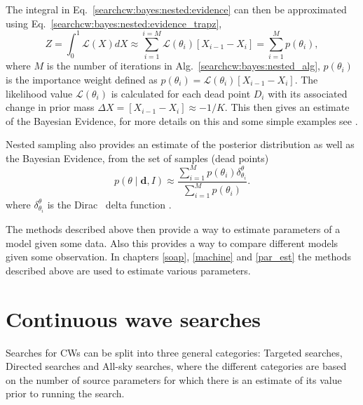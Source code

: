 The integral in Eq.~\ref{searchcw:bayes:nested:evidence} can then be approximated using Eq.~\ref{searchcw:bayes:nested:evidence_trapz},
\begin{equation}
\label{searchcw:bayes:nested:approx_evidence}
	Z = \int_0^1 \mathcal{L}(X) dX \approx \sum_{i=1}^{i=M}  \mathcal{L}(\theta_i)  \left[ X_{i-1} - X_{i} \right] = \sum_{i=1}^{M} p(\theta_i),
\end{equation}
where $M$ is the number of iterations in Alg.~\ref{searchcw:bayes:nested_alg}, $p(\theta_i)$ is the importance weight defined as $p(\theta_i) =  \mathcal{L}(\theta_i) \left[ X_{i-1} - X_{i} \right]$. The likelihood value $\mathcal{L}(\theta_i)$ is calculated for each dead point $D_i$ with its associated change in prior mass $\Delta X = \left[ X_{i-1} - X_{i} \right] \approx -1/K$. 
This then gives an estimate of the Bayesian Evidence, for more details on this and some simple examples see \citep{skilling2006NestedSampling,speagle2019DynestyDynamic,feroz2019ImportanceNested}.

Nested sampling also provides an estimate of the posterior distribution as well as the Bayesian Evidence, from the set of samples (dead points) 
\begin{equation}
	p(\theta \mid \bm{d}, I) \approx \frac{\sum_{i=1}^{M} p(\theta_i) \delta^{\theta}_{\theta_i}}{\sum_{i=1}^{M} p(\theta_i) }.
\end{equation}
where $\delta^{\theta}_{\theta_i}$ is the Dirac~ delta
function \citep{speagle2019DynestyDynamic}.~

The methods described above then provide a way to estimate parameters of a
model given some data.  Also this provides a way to compare different models
given some observation.  In chapters \ref{soap}, \ref{machine} and
\ref{par_est} the methods described above are used to estimate various
parameters.

\section{\label{searchcw:search} Continuous wave searches}

Searches for \glspl{CW} can be split into three general categories: Targeted
searches, Directed searches and All-sky searches, where the different
categories are based on the number of source parameters for which there is an estimate of its value prior to running the search.

